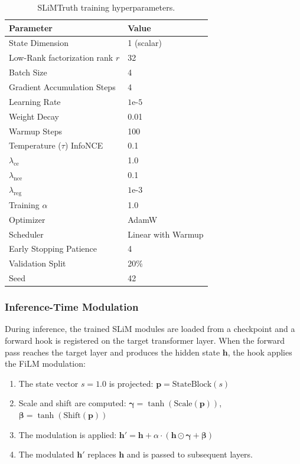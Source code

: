 \begin{table}[H]
\centering
\begin{tabularx}{\textwidth}{Xl}
    \toprule
    \textbf{Parameter} & \textbf{Value} \\
    \midrule
    State Dimension & 1 (scalar) \\
    Low-Rank factorization rank $r$ & 32 \\
    Batch Size & 4 \\
    Gradient Accumulation Steps & 4 \\
    Learning Rate & $1\text{e-}5$ \\
    Weight Decay & 0.01 \\
    Warmup Steps & 100 \\
    Temperature ($\tau$) InfoNCE & 0.1 \\
    $\lambda_{\mathrm{ce}}$ & 1.0 \\
    $\lambda_{\mathrm{nce}}$ & 0.1 \\
    $\lambda_{\mathrm{reg}}$ & $1\text{e-}3$ \\
    Training $\alpha$ & 1.0 \\
    Optimizer & AdamW \\
    Scheduler & Linear with Warmup \\
    Early Stopping Patience & 4 \\
    Validation Split & 20\% \\
    Seed & 42 \\
    \bottomrule
\end{tabularx}
\caption{SLiMTruth training hyperparameters.}
\label{tab:hyperparams-slim}
\end{table}

\subsubsection{Inference-Time Modulation}
\label{sec:slim-inference}

During inference, the trained SLiM modules are loaded from a checkpoint and a forward hook is registered on the target transformer layer. When the forward pass reaches the target layer and produces the hidden state $\mathbf{h}$, the hook applies the FiLM modulation:
\begin{enumerate}
    \item The state vector $s = 1.0$ is projected: $\mathbf{p} = \mathrm{StateBlock}(s)$
    \item Scale and shift are computed: $\boldsymbol{\gamma} = \tanh(\mathrm{Scale}(\mathbf{p}))$, $\boldsymbol{\beta} = \tanh(\mathrm{Shift}(\mathbf{p}))$
    \item The modulation is applied: $\mathbf{h}' = \mathbf{h} + \alpha \cdot (\mathbf{h} \odot \boldsymbol{\gamma} + \boldsymbol{\beta})$
    \item The modulated $\mathbf{h}'$ replaces $\mathbf{h}$ and is passed to subsequent layers.
\end{enumerate}

